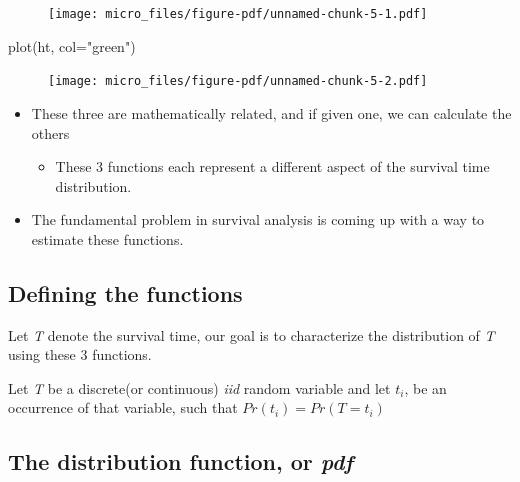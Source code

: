 \documentclass[
  letterpaper,
  DIV=11,
  numbers=noendperiod]{scrreprt}
\newenvironment{Shaded}{\begin{snugshade}}{\end{snugshade}}
\newcommand{\AttributeTok}[1]{\textcolor[rgb]{0.40,0.45,0.13}{#1}}
\newcommand{\FunctionTok}[1]{\textcolor[rgb]{0.28,0.35,0.67}{#1}}
\newcommand{\NormalTok}[1]{\textcolor[rgb]{0.00,0.23,0.31}{#1}}
\newcommand{\StringTok}[1]{\textcolor[rgb]{0.13,0.47,0.30}{#1}}
\providecommand{\tightlist}{%
  \setlength{\itemsep}{0pt}\setlength{\parskip}{0pt}}\usepackage{longtable,booktabs,array}
\begin{document}
\begin{figure}[H]

{\centering \texttt{[image: micro\_files/figure-pdf/unnamed-chunk-5-1.pdf]}

}

\end{figure}

\begin{Shaded}
\begin{Highlighting}[]
\FunctionTok{plot}\NormalTok{(ht, }\AttributeTok{col=}\StringTok{"green"}\NormalTok{)}
\end{Highlighting}
\end{Shaded}

\begin{figure}[H]

{\centering \texttt{[image: micro\_files/figure-pdf/unnamed-chunk-5-2.pdf]}

}

\end{figure}

\begin{itemize}
\tightlist
\item
  These three are mathematically related, and if given one, we can
  calculate the others

  \begin{itemize}
  \tightlist
  \item
    These 3 functions each represent a different aspect of the survival
    time distribution.
  \end{itemize}
\item
  The fundamental problem in survival analysis is coming up with a way
  to estimate these functions.
\end{itemize}

\hypertarget{defining-the-functions}{%
\subsection{Defining the functions}\label{defining-the-functions}}

Let \emph{T} denote the survival time, our goal is to characterize the
distribution of \emph{T} using these 3 functions.

Let \emph{T} be a discrete(or continuous) \emph{iid} random variable and
let \(t_i\), be an occurrence of that variable, such that
\(Pr(t_i)=Pr(T=t_i)\)

\hypertarget{the-distribution-function-or-pdf}{%
\subsection{\texorpdfstring{The distribution function, or
\emph{pdf}}{The distribution function, or pdf}}\label{the-distribution-function-or-pdf}}
\end{document}

